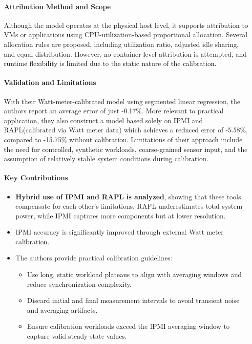\paragraph{Attribution Method and Scope}
Although the model operates at the physical host level, it supports attribution to VMs or applications using CPU-utilization-based proportional allocation. Several allocation rules are proposed, including utilization ratio, adjusted idle sharing, and equal distribution. However, no container-level attribution is attempted, and runtime flexibility is limited due to the static nature of the calibration.

\paragraph{Validation and Limitations}
With their Watt-meter-calibrated model using segmented linear regression, the authors report an average error of just -0.17\%. More relevant to practical application, they also construct a model based solely on IPMI and RAPL(calibrated via Watt meter data) which achieves a reduced error of -5.58\%, compared to -15.75\% without calibration. Limitations of their approach include the need for controlled, synthetic workloads, coarse-grained sensor input, and the assumption of relatively stable system conditions during calibration.

\paragraph{Key Contributions}
\begin{itemize}
    \item \textbf{Hybrid use of IPMI and RAPL is analyzed}, showing that these tools compensate for each other’s limitations. RAPL underestimates total system power, while IPMI captures more components but at lower resolution.
    \item IPMI accuracy is significantly improved through external Watt meter calibration.
    \item The authors provide practical calibration guidelines:
    \begin{itemize}
        \item Use long, static workload plateaus to align with averaging windows and reduce synchronization complexity.
        \item Discard initial and final measurement intervals to avoid transient noise and averaging artifacts.
        \item Ensure calibration workloads exceed the IPMI averaging window to capture valid steady-state values.
    \end{itemize}
\end{itemize}

